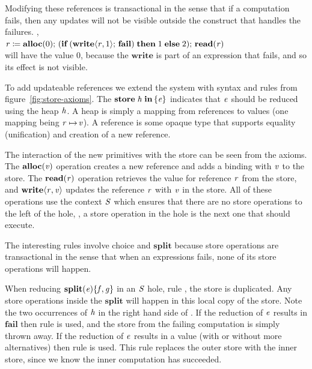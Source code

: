 Modifying these references is transactional in the sense that if a computation fails,
then any updates will not be visible outside the construct that handles the failures.
\Eg,\\
\ensuremath{\Varid{r}\mathrel{\coloneqq}\textbf{alloc}(\mathrm{0});\,(\textbf{if}\;(\textbf{write}\langle\Varid{r},\mathrm{1}\rangle;\,\textbf{fail})\;\textbf{then}\;\mathrm{1}\;\textbf{else}\;\mathrm{2});\,\textbf{read}(\Varid{r})}\\
will have the value \ensuremath{\mathrm{0}},
because the \ensuremath{\textbf{write}} is part of an expression that fails, and so its effect is not visible.


To add updateable references we extend the system with syntax and rules from figure~\ref{fig:store-axioms}.
The \ensuremath{\textbf{store}\;\Varid{h}\;\textbf{in}\,\{\Varid{e}\}} indicates that \ensuremath{\Varid{e}} should be reduced using the heap \ensuremath{\Varid{h}}.
A heap is simply a mapping from references to values (one mapping being \ensuremath{\Varid{r}\mapsto\!\Varid{v}}).
A reference is some opaque type that supports equality (unification) and creation of a new reference.

The interaction of the new primitives with the store can be seen from the axioms.
The \ensuremath{\textbf{alloc}(\Varid{v})} operation creates a new reference and adds a binding with \ensuremath{\Varid{v}} to the store.
The \ensuremath{\textbf{read}(\Varid{r})} operation retrieves the value for reference \ensuremath{\Varid{r}} from the store,
and \ensuremath{\textbf{write}\langle\Varid{r},\Varid{v}\rangle} updates the reference \ensuremath{\Varid{r}} with \ensuremath{\Varid{v}} in the store.
All of these operations use the context \ensuremath{\Conid{S}} which ensures that there are no store operations
to the left of the hole, \ie, a store operation in the hole is the next one that should execute.

The interesting rules involve choice and \ensuremath{\textbf{split}} because store operations are transactional in the sense
that when an expressions fails, none of its store operations will happen.

When reducing \ensuremath{\textbf{split}(\Varid{e})\{\Varid{f},\Varid{g}\}} in an \ensuremath{\Conid{S}} hole, rule , the store is duplicated.
Any store operations inside the \ensuremath{\textbf{split}} will happen in this local copy of the store.
Note the two occurrences of \ensuremath{\Varid{h}} in the right hand side of .
If the reduction of \ensuremath{\Varid{e}} results in \ensuremath{\textbf{fail}} then rule  is used,
and the store from the failing computation is simply thrown away.
If the reduction of \ensuremath{\Varid{e}} results in a value (with or without more alternatives) then rule
 is used.  This rule replaces the outer store with the inner store,
since we know the inner computation has succeeded.

